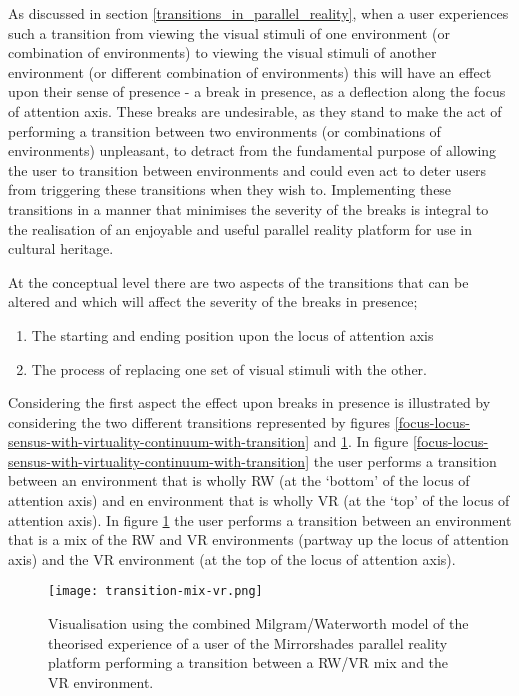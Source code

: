 As discussed in section \ref{transitions_in_parallel_reality}, when a user experiences such a transition from viewing the visual stimuli of one environment (or combination of environments) to viewing the visual stimuli of another environment (or different combination of environments) this will have an effect upon their sense of presence - a break in presence, as a deflection along the focus of attention axis. These breaks are undesirable, as they stand to make the act of performing a transition between two environments (or combinations of environments) unpleasant, to detract from the fundamental purpose of allowing the user to transition between environments and could even act to deter users from triggering these transitions when they wish to. Implementing these transitions in a manner that minimises the severity of the breaks is integral to the realisation of an enjoyable and useful parallel reality platform for use in cultural heritage.

At the conceptual level there are two aspects of the transitions that can be altered and which will affect the severity of the breaks in presence;
\begin{enumerate}
	\item The starting and ending position upon the locus of attention axis
	\item The process of replacing one set of visual stimuli with the other.
\end{enumerate}

Considering the first aspect the effect upon breaks in presence is illustrated by considering the two different transitions represented by figures \ref{focus-locus-sensus-with-virtuality-continuum-with-transition} and \ref{transition-mix-vr.png}. In figure \ref{focus-locus-sensus-with-virtuality-continuum-with-transition} the user performs a transition between an environment that is wholly RW (at the `bottom' of the locus of attention axis) and en environment that is wholly VR (at the `top' of the locus of attention axis). In figure \ref{transition-mix-vr.png} the user performs a transition between an environment that is a mix of the RW and VR environments (partway up the locus of attention axis) and the VR environment (at the top of the locus of attention axis).

\begin{figure}[h]
	\begin{center}
		\texttt{[image: transition-mix-vr.png]}
		\caption{Visualisation using the combined Milgram/Waterworth model of the theorised experience of a user of the Mirrorshades parallel reality platform performing a transition between a RW/VR mix and the VR environment.}
		\label{transition-mix-vr.png}
	\end{center}
\end{figure}

